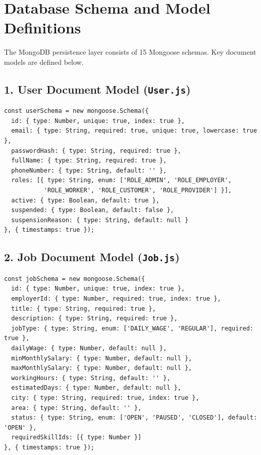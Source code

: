 \newpage
\chapter{Database Schema and Model Definitions}

The MongoDB persistence layer consists of 15 Mongoose schemas. Key document models are defined below.

\section*{1. User Document Model (\texttt{User.js})}
\begin{verbatim}
const userSchema = new mongoose.Schema({
  id: { type: Number, unique: true, index: true },
  email: { type: String, required: true, unique: true, lowercase: true },
  passwordHash: { type: String, required: true },
  fullName: { type: String, required: true },
  phoneNumber: { type: String, default: '' },
  roles: [{ type: String, enum: ['ROLE_ADMIN', 'ROLE_EMPLOYER', 
           'ROLE_WORKER', 'ROLE_CUSTOMER', 'ROLE_PROVIDER'] }],
  active: { type: Boolean, default: true },
  suspended: { type: Boolean, default: false },
  suspensionReason: { type: String, default: null }
}, { timestamps: true });
\end{verbatim}

\section*{2. Job Document Model (\texttt{Job.js})}
\begin{verbatim}
const jobSchema = new mongoose.Schema({
  id: { type: Number, unique: true, index: true },
  employerId: { type: Number, required: true, index: true },
  title: { type: String, required: true },
  description: { type: String, required: true },
  jobType: { type: String, enum: ['DAILY_WAGE', 'REGULAR'], required: true },
  dailyWage: { type: Number, default: null },
  minMonthlySalary: { type: Number, default: null },
  maxMonthlySalary: { type: Number, default: null },
  workingHours: { type: String, default: '' },
  estimatedDays: { type: Number, default: null },
  city: { type: String, required: true, index: true },
  area: { type: String, default: '' },
  status: { type: String, enum: ['OPEN', 'PAUSED', 'CLOSED'], default: 'OPEN' },
  requiredSkillIds: [{ type: Number }]
}, { timestamps: true });
\end{verbatim}

